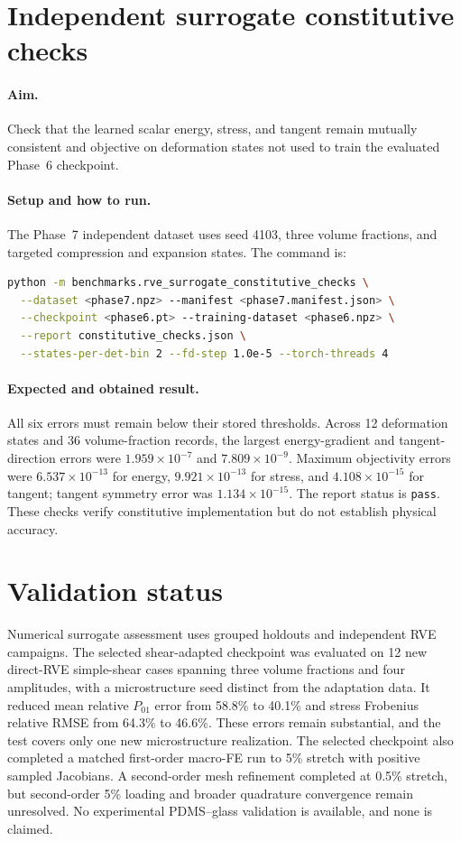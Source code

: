 \section{Independent surrogate constitutive checks}

\paragraph{Aim.}
Check that the learned scalar energy, stress, and tangent remain mutually
consistent and objective on deformation states not used to train the evaluated
Phase~6 checkpoint.

\paragraph{Setup and how to run.}
The Phase~7 independent dataset uses seed 4103, three volume fractions, and
targeted compression and expansion states. The command is:
\begin{lstlisting}[language=bash]
python -m benchmarks.rve_surrogate_constitutive_checks \
  --dataset <phase7.npz> --manifest <phase7.manifest.json> \
  --checkpoint <phase6.pt> --training-dataset <phase6.npz> \
  --report constitutive_checks.json \
  --states-per-det-bin 2 --fd-step 1.0e-5 --torch-threads 4
\end{lstlisting}

\paragraph{Expected and obtained result.}
All six errors must remain below their stored thresholds. Across 12
deformation states and 36 volume-fraction records, the largest energy-gradient
and tangent-direction errors were \(1.959\times10^{-7}\) and
\(7.809\times10^{-9}\). Maximum objectivity errors were
\(6.537\times10^{-13}\) for energy, \(9.921\times10^{-13}\) for stress, and
\(4.108\times10^{-15}\) for tangent; tangent symmetry error was
\(1.134\times10^{-15}\). The report status is \texttt{pass}. These checks
verify constitutive implementation but do not establish physical accuracy.

\section{Validation status}

Numerical surrogate assessment uses grouped holdouts and independent RVE
campaigns. The selected shear-adapted checkpoint was evaluated on 12 new
direct-RVE simple-shear cases spanning three volume fractions and four
amplitudes, with a microstructure seed distinct from the adaptation data. It
reduced mean relative \(P_{01}\) error from 58.8\% to 40.1\% and stress
Frobenius relative RMSE from 64.3\% to 46.6\%. These errors remain substantial,
and the test covers only one new microstructure realization. The selected
checkpoint also completed a matched first-order macro-FE run to 5\% stretch
with positive sampled Jacobians. A second-order mesh refinement completed at
0.5\% stretch, but second-order 5\% loading and broader quadrature convergence
remain unresolved. No experimental PDMS--glass validation is available, and
none is claimed.
